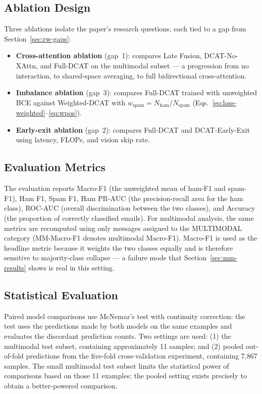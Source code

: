 \documentclass[10pt,twoside]{article}
\begin{document}
\subsection{Ablation Design}\label{sec:ablations}

Three ablations isolate the paper's research questions, each tied to a gap from Section~\ref{sec:rw-gaps}:

\begin{itemize}
\item \textbf{Cross-attention ablation} (gap~1): compares Late Fusion, DCAT-No-XAttn, and Full-DCAT on the multimodal subset --- a progression from no interaction, to shared-space averaging, to full bidirectional cross-attention.
\item \textbf{Imbalance ablation} (gap~3): compares Full-DCAT trained with unweighted BCE against Weighted-DCAT with $w_{\text{spam}} = N_{\text{ham}} / N_{\text{spam}}$ (Eqs.~\eqref{eq:loss-weighted}--\eqref{eq:wpos}).
\item \textbf{Early-exit ablation} (gap~2): compares Full-DCAT and DCAT-Early-Exit using latency, FLOPs, and vision skip rate.
\end{itemize}

\subsection{Evaluation Metrics}\label{sec:metrics}

The evaluation reports Macro-F1 (the unweighted mean of ham-F1 and spam-F1), Ham F1, Spam F1, Ham PR-AUC (the precision-recall area for the ham class), ROC-AUC (overall discrimination between the two classes), and Accuracy (the proportion of correctly classified emails). For multimodal analysis, the same metrics are recomputed using only messages assigned to the MULTIMODAL category (MM-Macro-F1 denotes multimodal Macro-F1). Macro-F1 is used as the headline metric because it weights the two classes equally and is therefore sensitive to majority-class collapse --- a failure mode that Section~\ref{sec:mm-results} shows is real in this setting.

\subsection{Statistical Evaluation}\label{sec:stats}

Paired model comparisons use McNemar's test \citep{mcnemar1947note} with continuity correction: the test uses the predictions made by both models on the same examples and evaluates the discordant prediction counts. Two settings are used: (1) the multimodal test subset, containing approximately 11 samples; and (2) pooled out-of-fold predictions from the five-fold cross-validation experiment, containing 7,867 samples. The small multimodal test subset limits the statistical power of comparisons based on those 11 examples; the pooled setting exists precisely to obtain a better-powered comparison.
\end{document}
